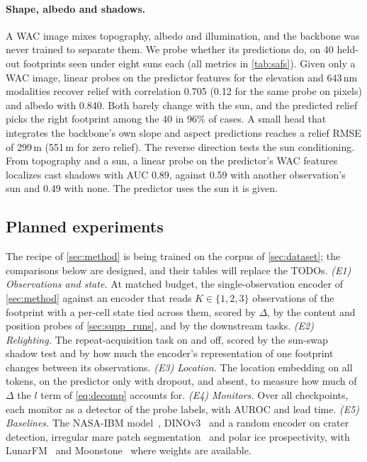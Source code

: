 \paragraph{Shape, albedo and shadows.} A WAC image mixes topography, albedo and illumination, and the backbone was never trained to separate them. We probe whether its predictions do, on 40 held-out footprints seen under eight suns each (all metrics in \cref{tab:safs}). Given only a WAC image, linear probes on the predictor features for the elevation and 643\,nm modalities recover relief with correlation 0.705 (0.12 for the same probe on pixels) and albedo with 0.840. Both barely change with the sun, and the predicted relief picks the right footprint among the 40 in 96\% of cases. A small head that integrates the backbone's own slope and aspect predictions reaches a relief RMSE of 299\,m (551\,m for zero relief). The reverse direction tests the sun conditioning. From topography and a sun, a linear probe on the predictor's WAC features localizes cast shadows with AUC 0.89, against 0.59 with another observation's sun and 0.49 with none. The predictor uses the sun it is given.

\subsection{Planned experiments}
\label{sec:planned}

The recipe of \cref{sec:method} is being trained on the corpus of \cref{sec:dataset}; the comparisons below are designed, and their tables will replace the TODOs. \emph{(E1) Observations and state.} At matched budget, the single-observation encoder of \cref{sec:method} against an encoder that reads $K\in\{1,2,3\}$ observations of the footprint with a per-cell state tied across them, scored by $\Delta$, by the content and position probes of \cref{sec:supp_runs}, and by the downstream tasks. \emph{(E2) Relighting.} The repeat-acquisition task on and off, scored by the sun-swap shadow test and by how much the encoder's representation of one footprint changes between its observations. \emph{(E3) Location.} The location embedding on all tokens, on the predictor only with dropout, and absent, to measure how much of $\Delta$ the $l$ term of \cref{eq:decomp} accounts for. \emph{(E4) Monitors.} Over all checkpoints, each monitor as a detector of the probe labels, with AUROC and lead time. \emph{(E5) Baselines.} The NASA-IBM model~\cite{fraccaro2026multimodal}, DINOv3~\cite{simeoni2026dinov3} and a random encoder on crater detection, irregular mare patch segmentation~\cite{braden2014evidence,patil2026sombench} and polar ice prospectivity, with LunarFM~\cite{gironamata2026lunarfm} and Moonstone~\cite{prasad2026moonstone} where weights are available.
